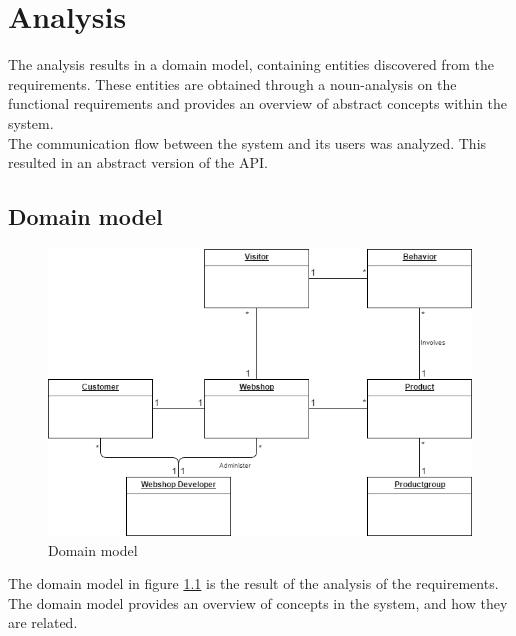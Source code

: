 
\chapter{Analysis} %

\label{Analysis} %


The analysis results in a domain model, containing entities discovered from the requirements. These entities are obtained through a noun-analysis on the functional requirements and provides an overview of abstract concepts within the system.\\
The communication flow between the system and its users was analyzed. This resulted in an abstract version of the API.

\section{Domain model}
\begin{figure}[H]
	\centering
	\includegraphics[width=.8\linewidth]{Figures/Domain_model.png}
	\caption{Domain model}
	\label{fig:DomainModel}
\end{figure}

The domain model in figure \ref{fig:DomainModel} is the result of the analysis of the requirements. The domain model provides an overview of concepts in the system, and how they are related.

